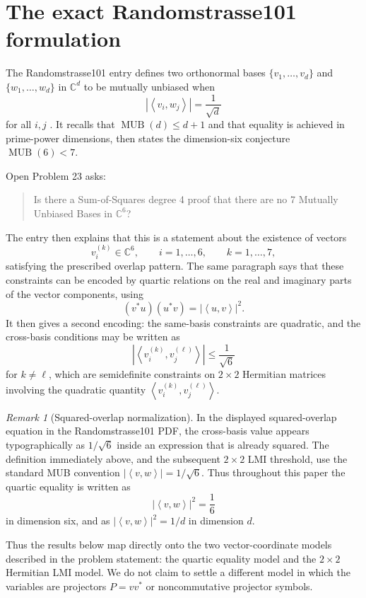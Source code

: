 \documentclass[11pt]{article}
\theoremstyle{remark}
\newtheorem{remark}[theorem]{Remark}
\newcommand{\C}{\mathbb{C}}
\newcommand{\ip}[2]{\left\langle #1,#2\right\rangle}
\begin{document}
\section{The exact Randomstrasse101 formulation}

The Randomstrasse101 entry defines two orthonormal bases $\{v_1,\ldots,v_d\}$ and $\{w_1,\ldots,w_d\}$ in $\C^d$ to be mutually unbiased when
\[
|\ip{v_i}{w_j}|=\frac1{\sqrt d}
\]
for all $i,j$ \cite{Randomstrasse2026}. It recalls that $\operatorname{MUB}(d)\le d+1$ and that equality is achieved in prime-power dimensions, then states the dimension-six conjecture $\operatorname{MUB}(6)<7$.

Open Problem 23 asks:
\begin{quote}
Is there a Sum-of-Squares degree 4 proof that there are no 7 Mutually Unbiased Bases in $\C^6$?
\end{quote}
The entry then explains that this is a statement about the existence of vectors
\[
v_i^{(k)}\in\C^6,
\qquad i=1,\ldots,6,
\qquad k=1,\ldots,7,
\]
satisfying the prescribed overlap pattern. The same paragraph says that these constraints can be encoded by quartic relations on the real and imaginary parts of the vector components, using
\[
(v^*u)(u^*v)=|\ip{u}{v}|^2.
\]
It then gives a second encoding: the same-basis constraints are quadratic, and the cross-basis conditions may be written as
\[
|\ip{v_i^{(k)}}{v_j^{(\ell)}}|\le \frac1{\sqrt6}
\]
for $k\ne \ell$, which are semidefinite constraints on $2\times2$ Hermitian matrices involving the quadratic quantity $\ip{v_i^{(k)}}{v_j^{(\ell)}}$.

\begin{remark}[Squared-overlap normalization]
In the displayed squared-overlap equation in the Randomstrasse101 PDF, the cross-basis value appears typographically as $1/\sqrt6$ inside an expression that is already squared. The definition immediately above, and the subsequent $2\times2$ LMI threshold, use the standard MUB convention $|\ip{v}{w}|=1/\sqrt6$. Thus throughout this paper the quartic equality is written as
\[
|\ip{v}{w}|^2=\frac16
\]
in dimension six, and as $|\ip{v}{w}|^2=1/d$ in dimension $d$.
\end{remark}

Thus the results below map directly onto the two vector-coordinate models described in the problem statement: the quartic equality model and the $2\times2$ Hermitian LMI model. We do not claim to settle a different model in which the variables are projectors $P=vv^*$ or noncommutative projector symbols.
\end{document}
